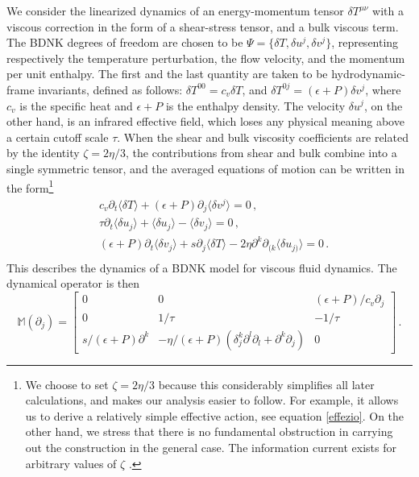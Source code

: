 \documentclass[a4paper, amsfonts, amssymb, amsmath, reprint, showkeys, nofootinbib, twoside,notitlepage,onecolumn]{revtex4-2}
\newcommand{\Ma}{{\mathbb{M}}}
\theoremstyle{definition}
\begin{document}
We consider the linearized dynamics of an energy-momentum tensor $\delta T^{\mu \nu}$ with a viscous correction in the form of a shear-stress tensor, and a bulk viscous term. The BDNK degrees of freedom are chosen to be $\Psi=\{\delta T, \delta u^j, \delta v^j \}$, representing respectively the temperature perturbation, the flow velocity, and the momentum per unit enthalpy. The first and the last quantity are taken to be hydrodynamic-frame invariants, defined as follows: $\delta T^{00}=c_v \delta T$, and $\delta T^{0j}=(\epsilon+P)\delta v^j$, where $c_v$ is the specific heat and $\epsilon+P$ is the enthalpy density. The velocity $\delta u^j$, on the other hand, is an infrared effective field, which loses any physical meaning above a certain cutoff scale $\tau$. When the shear and bulk viscosity coefficients are related by the identity $\zeta = 2\eta / 3$, the contributions from shear and bulk combine into a single symmetric tensor, and the averaged equations of motion can be written in the form\footnote{We choose to set $\zeta=2\eta/3$ because this considerably simplifies all later calculations, and makes our analysis easier to follow. For example, it allows us to derive a relatively simple effective action, see equation \eqref{effezio}. On the other hand, we stress that there is no fundamental obstruction in carrying out the construction in the general
case. The information current exists for arbitrary values of $\zeta$ \cite{Gavassino:2024ufs}.} 
\begin{equation} \label{Eq:shear_model}
    \begin{split}
        & c_v \partial_t \langle \delta T\rangle + (\epsilon + P) \partial_j \langle \delta v^j \rangle = 0 \, , \\
        & \tau \partial_t \langle\delta u_j \rangle + \langle \delta  u_j\rangle - \langle \delta v_j \rangle =0 \, ,\\
        & (\epsilon + P) \partial_t \langle \delta v_j \rangle + s \partial_j \langle \delta T \rangle - 2\eta \partial^k \partial_{(k} \langle \delta u_{j)} \rangle = 0 \, .\\
    \end{split}
\end{equation}
This describes the dynamics of a BDNK model for viscous fluid dynamics. The dynamical operator is then 
\begin{equation}
    \Ma (\partial_j) = \begin{bmatrix}
        0 & 0 & (\epsilon + P)/c_v \partial_j \\
        0 & 1/\tau & -1/\tau \\
        s/(\epsilon + P) \partial^k & -\eta / (\epsilon + P) (\delta^k_j \partial^l \partial_l + \partial^k \partial_j) & 0
    \end{bmatrix} \, .
\end{equation}
\end{document}
